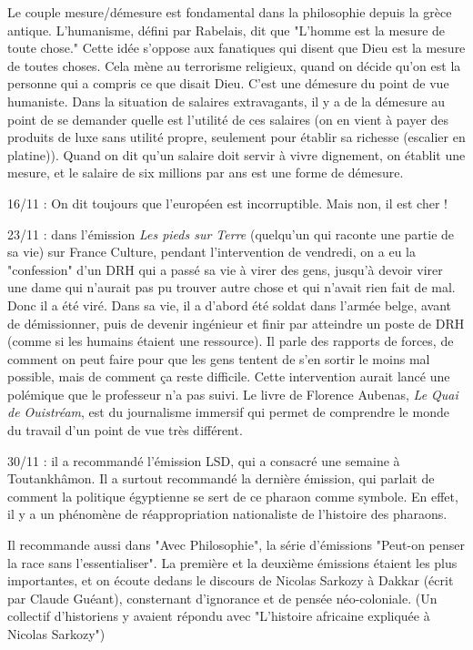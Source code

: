 \documentclass[a4paper,12pt]{book}
\begin{document}
\par Le couple mesure/démesure est fondamental dans la philosophie depuis la grèce antique. L'humanisme, défini par Rabelais, dit que "L'homme est la mesure de toute chose." Cette idée s'oppose aux fanatiques qui disent que Dieu est la mesure de toutes choses. Cela mène au terrorisme religieux, quand on décide qu'on est la personne qui a compris ce que disait Dieu. C'est une démesure du point de vue humaniste. Dans la situation de salaires extravagants, il y a de la démesure au point de se demander quelle est l'utilité de ces salaires (on en vient à payer des produits de luxe sans utilité propre, seulement pour établir sa richesse (escalier en platine)). Quand on dit qu'un salaire doit servir à vivre dignement, on établit une mesure, et le salaire de six millions par ans est une forme de démesure.
\par 16/11 : On dit toujours que l'européen est incorruptible. Mais non, il est cher !
\par 23/11 : dans l'émission \textit{Les pieds sur Terre} (quelqu'un qui raconte une partie de sa vie) sur France Culture, pendant l'intervention de vendredi, on a eu la "confession" d'un DRH qui a passé sa vie à virer des gens, jusqu'à devoir virer une dame qui n'aurait pas pu trouver autre chose et qui n'avait rien fait de mal. Donc il a été viré. Dans sa vie, il a d'abord été soldat dans l'armée belge, avant de démissionner, puis de devenir ingénieur et finir par atteindre un poste de DRH (comme si les humains étaient une ressource). Il parle des rapports de forces, de comment on peut faire pour que les gens tentent de s'en sortir le moins mal possible, mais de comment ça reste difficile. Cette intervention aurait lancé une polémique que le professeur n'a pas suivi. Le livre de Florence Aubenas, \textit{Le Quai de Ouistréam}, est du journalisme immersif qui permet de comprendre le monde du travail d'un point de vue très différent.
\par 30/11 : il a recommandé l'émission LSD, qui a consacré une semaine à Toutankhâmon. Il a surtout recommandé la dernière émission, qui parlait de comment la politique égyptienne se sert de ce pharaon comme symbole. En effet, il y a un phénomène de réappropriation nationaliste de l'histoire des pharaons.
\par Il recommande aussi dans "Avec Philosophie", la série d'émissions "Peut-on penser la race sans l'essentialiser". La première et la deuxième émissions étaient les plus importantes, et on écoute dedans le discours de Nicolas Sarkozy à Dakkar (écrit par Claude Guéant), consternant d'ignorance et de pensée néo-coloniale. (Un collectif d'historiens y avaient répondu avec "L'histoire africaine expliquée à Nicolas Sarkozy")
\end{document}
